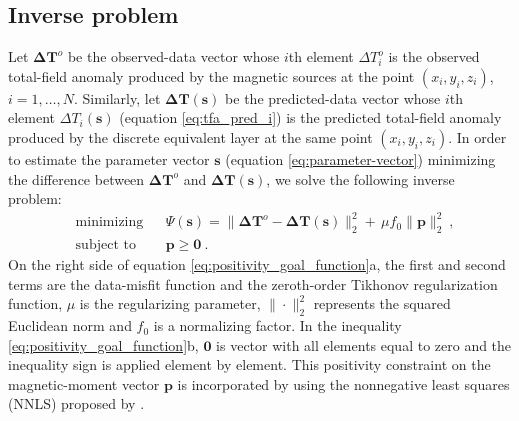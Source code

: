 \subsection{Inverse problem}

Let $\mathbf{\Delta T}^{o}$ be the observed-data vector whose $i$th element $\Delta T_{i}^{o}$
is the observed total-field anomaly produced by the magnetic sources at the point 
$(x_{i},y_{i},z_{i})$, $i = 1, \dots, N$. 
Similarly, let $\mathbf{\Delta T} (\mathbf{s})$ be the predicted-data vector whose $i$th element 
$\Delta T_{i}(\mathbf{s})$ (equation \ref{eq:tfa_pred_i}) is the predicted total-field anomaly  
produced by the discrete equivalent layer at the same point $(x_{i},y_{i},z_{i})$. 
In order to estimate the parameter vector $\mathbf{s}$ (equation \ref{eq:parameter-vector})
minimizing the difference between $\mathbf{\Delta T}^{o}$ and 
$\mathbf{\Delta T}(\mathbf{s})$, we solve the following inverse problem:
\begin{subequations}
	\begin{align}
	& \text{minimizing}
	& &\Psi(\mathbf{s}) =\lVert \mathbf{\Delta T}^{o} - \mathbf{\Delta T} (\mathbf{s}) \rVert_{2}^{2} + \, \mu f_0 \parallel \mathbf{p} \parallel_{2}^{2} \: , \\
	& \text{subject to}
	& & \mathbf{p} \geqslant \mathbf{0} \: .
	\end{align}
	\label{eq:positivity_goal_function}
\end{subequations}
On the right side of equation \ref{eq:positivity_goal_function}a, the first and second terms are 
the data-misfit function and the zeroth-order Tikhonov regularization function, $\mu$ is the 
regularizing parameter, $\| \cdot \|_{2}^{2}$ represents the squared Euclidean norm and $f_0$ is a 
normalizing factor. In the inequality \ref{eq:positivity_goal_function}b, $\mathbf{0}$ is vector 
with all elements equal to zero and the inequality sign is applied element by element. This 
positivity constraint on the magnetic-moment vector $\mathbf{p}$ 
is incorporated by using the nonnegative least squares (NNLS) proposed by 
\cite{lawson_hanson_1974}. 

